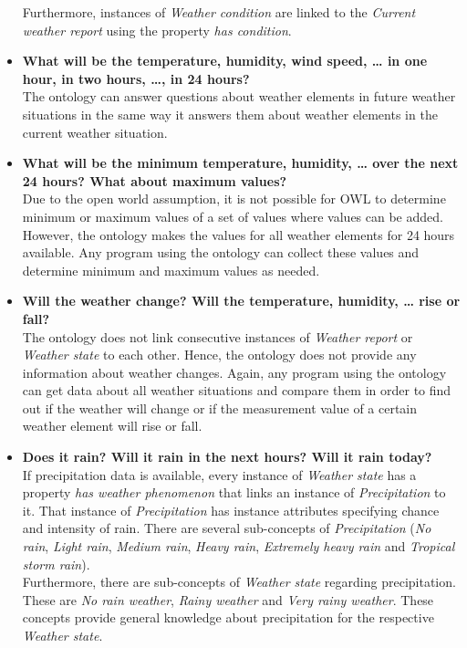 \begin{itemize}
    Furthermore, instances of \emph{Weather condition} are linked to the \emph{Current weather report} using the property \emph{has condition}.
  \item \textbf{What will be the temperature, humidity, wind speed, … in one hour, in two hours, …, in 24 hours?}\\
    The ontology can answer questions about weather elements in future weather situations in the same way it answers them about weather elements in the current weather situation.
  \item \textbf{What will be the minimum temperature, humidity, … over the next 24 hours? What about maximum values?}\\ %
    Due to the open world assumption, it is not possible for OWL to determine minimum or maximum values of a set of values where values can be added. However, the \thinkhomeweather ontology makes the values for all weather elements for 24 hours available. Any program using the ontology can collect these values and determine minimum and maximum values as needed.
  \item \textbf{Will the weather change? Will the temperature, humidity, … rise or fall?}\\
    The \thinkhomeweather ontology does not link consecutive instances of \emph{Weather report} or \emph{Weather state} to each other. Hence, the ontology does not provide any information about weather changes. Again, any program using the ontology can get data about all weather situations and compare them in order to find out if the weather will change or if the measurement value of a certain weather element will rise or fall.
  \item \textbf{Does it rain? Will it rain in the next hours? Will it rain today?}\\
    If precipitation data is available, every instance of \emph{Weather state} has a property \emph{has weather phenomenon} that links an instance of \emph{Precipitation} to it. That instance of \emph{Precipitation} has instance attributes specifying chance and intensity of rain. There are several sub-concepts of \emph{Precipitation} (\emph{No rain}, \emph{Light rain}, \emph{Medium rain}, \emph{Heavy rain}, \emph{Extremely heavy rain} and \emph{Tropical storm rain}).\\
    Furthermore, there are sub-concepts of \emph{Weather state} regarding precipitation. These are \emph{No rain weather}, \emph{Rainy weather} and \emph{Very rainy weather}. These concepts provide general knowledge about precipitation for the respective \emph{Weather state}.\\

\end{itemize}
